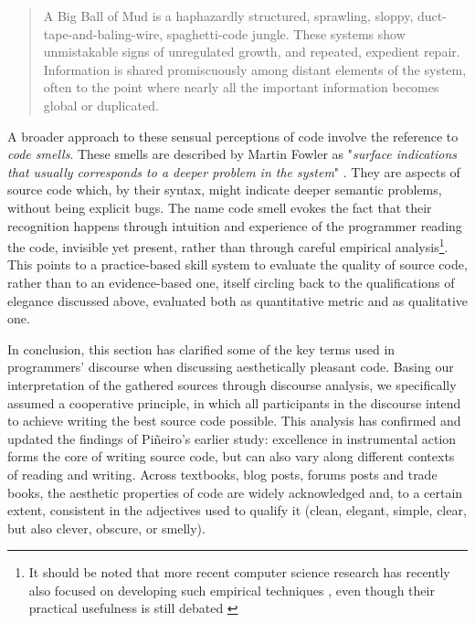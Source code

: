 \begin{quote}
  A Big Ball of Mud is a haphazardly structured, sprawling, sloppy, duct-tape-and-baling-wire, spaghetti-code jungle. These systems show unmistakable signs of unregulated growth, and repeated, expedient repair. Information is shared promiscuously among distant elements of the system, often to the point where nearly all the important information becomes global or duplicated. \citep{foote_big_1997}
\end{quote}

A broader approach to these sensual perceptions of code involve the reference to \emph{code smells}. These smells are described by Martin Fowler as "\emph{surface indications that usually corresponds to a deeper problem in the system}" \citep{fowler_refactoring_1999}. They are aspects of source code which, by their syntax, might indicate deeper semantic problems, without being explicit bugs. The name code smell evokes the fact that their recognition happens through intuition and experience of the programmer reading the code, \nohyphens{invisible yet present}, rather than through careful empirical analysis\footnote{It should be noted that more recent computer science research has recently also focused on developing such empirical techniques \citep{rasool_review_2015}, even though their practical usefulness is still debated \citep{santos_systematic_2018}}. This points to a practice-based skill system to evaluate the quality of source code, rather than to an evidence-based one, itself circling back to the qualifications of elegance discussed above, evaluated both as quantitative metric and as qualitative one.

\spacersmall

In conclusion, this section has clarified some of the key terms used in programmers' discourse when discussing aesthetically pleasant code. Basing our interpretation of the gathered sources through discourse analysis, we specifically assumed a cooperative principle, in which all participants in the discourse intend to achieve writing the best source code possible. This analysis has confirmed and updated the findings of Piñeiro's earlier study: excellence in instrumental action forms the core of writing source code, but can also vary along different contexts of reading and writing. Across textbooks, blog posts, forums posts and trade books, the aesthetic properties of code are widely acknowledged and, to a certain extent, consistent in the adjectives used to qualify it (clean, elegant, simple, clear, but also clever, obscure, or smelly).

